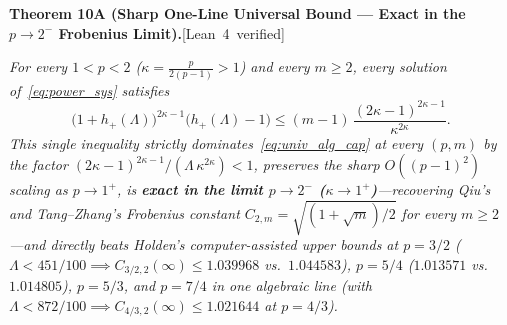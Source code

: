 \documentclass[10pt,letterpaper]{article}
\newcommand{\leanbadge}[1]{\mbox{\sffamily\scriptsize\color{leanborder}[#1]}}
\begin{document}
\begin{tcolorbox}[mathbox]
\textbf{Theorem 10A (Sharp One-Line Universal Bound — Exact in the $p \to 2^-$ Frobenius Limit).}\hfill\leanbadge{Lean~4 verified}\par\vspace{1.5pt}
\emph{For every $1 < p < 2$ ($\kappa = \frac{p}{2(p-1)} > 1$) and every $m \ge 2$, every solution of~\eqref{eq:power_sys} satisfies}
\begin{equation}\label{eq:thm10A}
  \bigl(1 + h_+(\Lambda)\bigr)^{2\kappa - 1}\bigl(h_+(\Lambda) - 1\bigr)
  \le (m - 1)\,\frac{(2\kappa - 1)^{2\kappa - 1}}{\kappa^{2\kappa}}.
\end{equation}
\emph{This single inequality strictly dominates~\eqref{eq:univ_alg_cap} at every $(p, m)$ by the factor $(2\kappa-1)^{2\kappa-1}/(\Lambda\,\kappa^{2\kappa}) < 1$, preserves the sharp $O((p-1)^2)$ scaling as $p \to 1^+$, is \textbf{exact in the limit $p \to 2^-$ ($\kappa \to 1^+$)}—recovering Qiu's and Tang--Zhang's Frobenius constant $C_{2,m} = \sqrt{(1+\sqrt{m})/2}$ for every $m \ge 2$—and directly beats Holden's computer-assisted upper bounds at $p = 3/2$ ($\Lambda < 451/100 \implies C_{3/2,2}(\infty) \le 1.039968$ vs.\ $1.044583$), $p = 5/4$ ($1.013571$ vs.\ $1.014805$), $p = 5/3$, and $p = 7/4$ in one algebraic line (with $\Lambda < 872/100 \implies C_{4/3,2}(\infty) \le 1.021644$ at $p = 4/3$).}
\end{tcolorbox}
\end{document}
